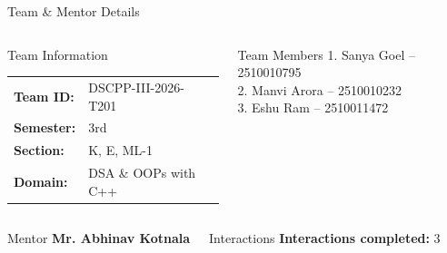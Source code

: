 \documentclass[aspectratio=169,11pt]{beamer}
\begin{document}
\begin{frame}{Team \& Mentor Details}
\begin{columns}[T,totalwidth=\textwidth]\small

\begin{block}{Team Information}
\begin{tabular}{@{}ll@{}}
\textbf{Team ID:} & DSCPP-III-2026-T201\\
\textbf{Semester:} & 3rd\\
\textbf{Section:} & K, E, ML-1\\
\textbf{Domain:} & DSA \& OOPs with C++
\end{tabular}
\end{block}

\begin{block}{Team Members}
1. Sanya Goel -- 2510010795\\[1mm]
2. Manvi Arora -- 2510010232\\[1mm]
3. Eshu Ram -- 2510011472
\end{block}

\end{columns}

\vspace{2mm}
\begin{columns}[T,totalwidth=\textwidth]
\begin{block}{Mentor}
\textbf{Mr. Abhinav Kotnala}
\end{block}
\begin{block}{Interactions}
\textbf{Interactions completed:} 3
\end{block}
\end{columns}
\end{frame}
\end{document}
